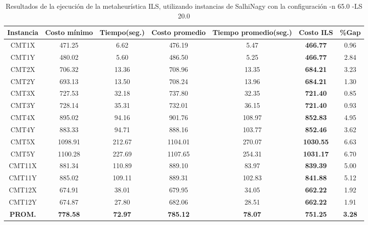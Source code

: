 \begin{table}[ht]
\caption{Resultados de la ejecución de la metaheurística ILS, utilizando instancias de SalhiNagy con la configuración -n 65.0 -LS 20.0}
\centering
\small
\begin{tabular}{c c c c c c c}
\hline\hline
Instancia & Costo mínimo & Tiempo(seg.) & Costo promedio & Tiempo promedio(seg.) & Costo ILS & \%Gap \\ [0.5ex]
\hline
CMT1X & 471.25 & 6.62 & 
476.19 & 5.47 & \bf{466.77} & 
0.96\\CMT1Y & 480.02 & 5.60 & 
486.50 & 5.25 & \bf{466.77} & 
2.84\\CMT2X & 706.32 & 13.36 & 
708.96 & 13.35 & \bf{684.21} & 
3.23\\CMT2Y & 693.13 & 13.50 & 
708.24 & 13.96 & \bf{684.21} & 
1.30\\CMT3X & 727.53 & 32.18 & 
737.80 & 32.35 & \bf{721.40} & 
0.85\\CMT3Y & 728.14 & 35.31 & 
732.01 & 36.15 & \bf{721.40} & 
0.93\\CMT4X & 895.02 & 94.16 & 
901.76 & 108.97 & \bf{852.83} & 
4.95\\CMT4Y & 883.33 & 94.71 & 
888.16 & 103.77 & \bf{852.46} & 
3.62\\CMT5X & 1098.91 & 212.67 & 
1104.01 & 270.07 & \bf{1030.55} & 
6.63\\CMT5Y & 1100.28 & 227.69 & 
1107.65 & 254.31 & \bf{1031.17} & 
6.70\\CMT11X & 881.34 & 110.89 & 
889.10 & 83.97 & \bf{839.39} & 
5.00\\CMT11Y & 885.02 & 109.11 & 
889.31 & 102.83 & \bf{841.88} & 
5.12\\CMT12X & 674.91 & 38.01 & 
679.95 & 34.05 & \bf{662.22} & 
1.92\\CMT12Y & 674.87 & 27.80 & 
682.06 & 28.51 & \bf{662.22} & 
1.91\\\bf{PROM.} & 
\bf{778.58} & \bf{72.97} & \bf{785.12} & \bf{78.07} & \bf{751.25} & \bf{3.28}\\[1ex]\hline
\end{tabular}
\label{table:nonlin}
\end{table} \clearpage
